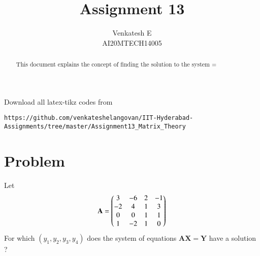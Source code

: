 \documentclass[journal,12pt,twocolumn]{IEEEtran}
\begin{document}
\makeatletter
{}
\makeatother
\let\StandardTheFigure\thefigure
\let\vec\mathbf
\renewcommand{\thefigure}{\theproblem}
\def\putbox#1#2#3{\makebox[0in][l]{\makebox[#1][l]{}\raisebox{\baselineskip}[0in][0in]{\raisebox{#2}[0in][0in]{#3}}}}
     \def\rightbox#1{\makebox[0in][r]{#1}}
     \def\centbox#1{\makebox[0in]{#1}}
     \def\topbox#1{\raisebox{-\baselineskip}[0in][0in]{#1}}
     \def\midbox#1{\raisebox{-0.5\baselineskip}[0in][0in]{#1}}
\vspace{3cm}
\title{Assignment 13}
\author{Venkatesh E\\AI20MTECH14005}
\maketitle
\newpage
\bigskip
\renewcommand{\thefigure}{\theenumi}
\renewcommand{\thetable}{\theenumi}
\begin{abstract}
This document explains the concept of finding the solution to the system \vec{A}\vec{X}=\vec{Y} 
\end{abstract}
Download all latex-tikz codes from 
%
\begin{lstlisting}
https://github.com/venkateshelangovan/IIT-Hyderabad-Assignments/tree/master/Assignment13_Matrix_Theory
\end{lstlisting}
\section{Problem}
Let
\begin{align}
    \vec{A}=\myvec{3 & -6 & 2 & -1\\-2 & 4 & 1 & 3\\0 & 0 & 1& 1\\1 & -2 & 1 & 0} 
\end{align}
For which $(y_1,y_2,y_3,y_4)$ does the system of equations $\vec{A}\vec{X}=\vec{Y}$ have a solution ? 
\end{document}
